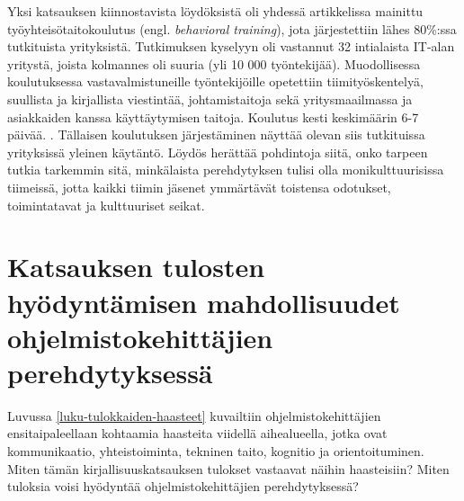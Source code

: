 \documentclass[utf8]{gradu3}
\begin{document}
Yksi katsauksen kiinnostavista löydöksistä oli yhdessä artikkelissa mainittu työyhteisötaitokoulutus (engl. \textit{behavioral training}), jota järjestettiin lähes 80\%:ssa tutkituista yrityksistä. Tutkimuksen kyselyyn oli vastannut 32 intialaista IT-alan yritystä, joista kolmannes oli suuria (yli 10 000 työntekijää). Muodollisessa koulutuksessa vastavalmistuneille työntekijöille opetettiin tiimityöskentelyä, suullista ja kirjallista viestintää, johtamistaitoja sekä yritysmaailmassa ja asiakkaiden kanssa käyttäytymisen taitoja. Koulutus kesti keskimäärin 6-7 päivää. \parencite{kulkarni-ym-2010}. Tällaisen koulutuksen järjestäminen näyttää olevan siis tutkituissa yrityksissä yleinen käytäntö. Löydös herättää pohdintoja siitä, onko tarpeen tutkia tarkemmin sitä, minkälaista perehdytyksen tulisi olla monikulttuurisissa tiimeissä, jotta kaikki tiimin jäsenet ymmärtävät toistensa odotukset, toimintatavat ja kulttuuriset seikat. 


\section{Katsauksen tulosten hyödyntämisen mahdollisuudet ohjelmistokehittäjien perehdytyksessä}

Luvussa \ref{luku-tulokkaiden-haasteet} kuvailtiin ohjelmistokehittäjien ensitaipaleellaan kohtaamia haasteita viidellä aihealueella, jotka ovat kommunikaatio, yhteistoiminta, tekninen taito, kognitio ja orientoituminen. Miten tämän kirjallisuuskatsauksen tulokset vastaavat näihin haasteisiin? Miten tuloksia voisi hyödyntää ohjelmistokehittäjien perehdytyksessä?
\end{document}
